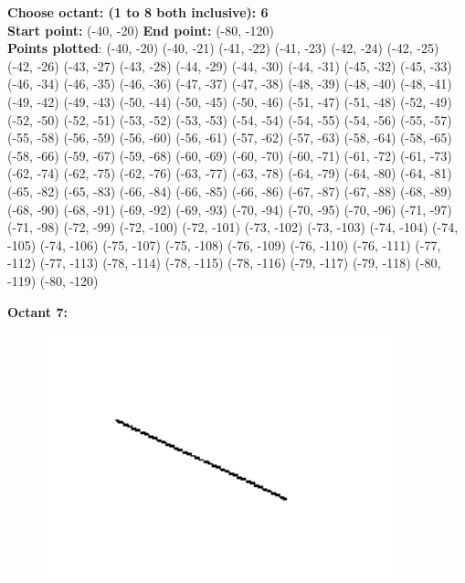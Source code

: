 \documentclass[12pt,letterpaper]{article}
\begin{document}
\textbf{Choose octant: (1 to 8 both inclusive): 6}\\
\textbf{Start point:} (-40, -20)
\textbf{End point:} (-80, -120)\\
\textbf{Points plotted}: 
(-40, -20) (-40, -21) (-41, -22) (-41, -23) 
(-42, -24) (-42, -25) (-42, -26) (-43, -27) 
(-43, -28) (-44, -29) (-44, -30) (-44, -31) 
(-45, -32) (-45, -33) (-46, -34) (-46, -35) 
(-46, -36) (-47, -37) (-47, -38) (-48, -39) 
(-48, -40) (-48, -41) (-49, -42) (-49, -43) 
(-50, -44) (-50, -45) (-50, -46) (-51, -47) 
(-51, -48) (-52, -49) (-52, -50) (-52, -51) 
(-53, -52) (-53, -53) (-54, -54) (-54, -55) 
(-54, -56) (-55, -57) (-55, -58) (-56, -59) 
(-56, -60) (-56, -61) (-57, -62) (-57, -63) 
(-58, -64) (-58, -65) (-58, -66) (-59, -67) 
(-59, -68) (-60, -69) (-60, -70) (-60, -71) 
(-61, -72) (-61, -73) (-62, -74) (-62, -75) 
(-62, -76) (-63, -77) (-63, -78) (-64, -79) 
(-64, -80) (-64, -81) (-65, -82) (-65, -83) 
(-66, -84) (-66, -85) (-66, -86) (-67, -87) 
(-67, -88) (-68, -89) (-68, -90) (-68, -91) 
(-69, -92) (-69, -93) (-70, -94) (-70, -95) 
(-70, -96) (-71, -97) (-71, -98) (-72, -99) 
(-72, -100) (-72, -101) (-73, -102) (-73, -103) 
(-74, -104) (-74, -105) (-74, -106) (-75, -107) 
(-75, -108) (-76, -109) (-76, -110) (-76, -111) 
(-77, -112) (-77, -113) (-78, -114) (-78, -115) 
(-78, -116) (-79, -117) (-79, -118) (-80, -119) 
(-80, -120)


\newpage
\textbf{Octant 7:}
\begin{figure}[h]
    \centering
    \includegraphics[height=7cm]{Outputs/O7.png}
\end{figure}
\end{document}
